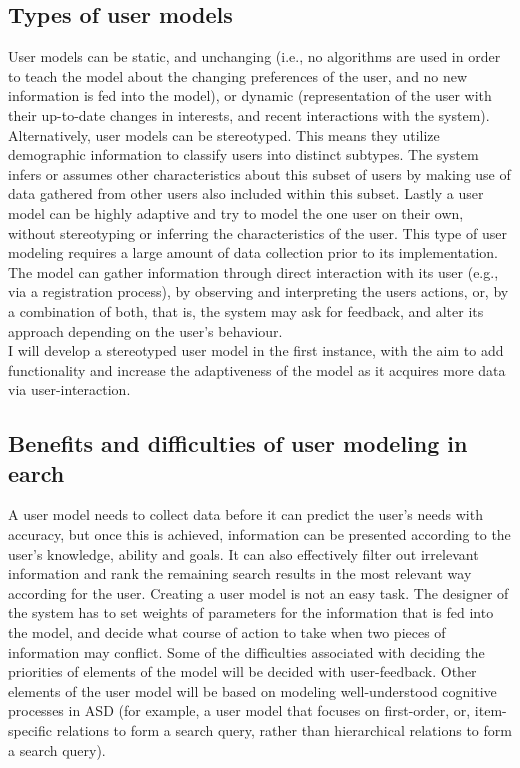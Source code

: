\documentclass[10pt]{article}
\begin{document}
\subsection{Types of user models}
User models can be static, and unchanging (i.e., no algorithms are used in order to teach the model about the changing preferences of the user, and no new information is fed into the model), or dynamic (representation of the user with their up-to-date changes in interests, and recent interactions with the system). Alternatively, user models can be stereotyped. This means they utilize demographic information to classify users into distinct subtypes. The system infers or assumes other characteristics about this subset of users by making use of data gathered from other users also included within this subset. Lastly a user model can be highly adaptive and try to model the one user on their own, without stereotyping or inferring the characteristics of the user. This type of user modeling requires a large amount of data collection prior to its implementation.\\
The model can gather information through direct interaction with its user (e.g., via a registration process), by observing and interpreting the users actions, or, by a combination of both, that is, the system may ask for feedback, and alter its approach depending on the user’s behaviour.\\
I will develop a stereotyped user model in the first instance, with the aim to add functionality and increase the adaptiveness of the model as it acquires more data via user-interaction.

\subsection{Benefits and difficulties of user modeling in earch}
A user model needs to collect data before it can predict the user’s needs with accuracy, but once this is achieved, information can be presented according to the user’s knowledge, ability and goals. It can also effectively filter out irrelevant information and rank the remaining search results in the most relevant way according for the user.
Creating a user model is not an easy task. The designer of the system has to set weights of parameters for the information that is fed into the model, and decide what course of action to take when two pieces of information may conflict. Some of the difficulties associated with deciding the priorities of elements of the model will be decided with user-feedback. Other elements of the user model will be based on modeling well-understood cognitive processes in ASD (for example, a user model that focuses on first-order, or, item-specific relations to form a search query, rather than hierarchical relations to form a search query).  
\end{document}
